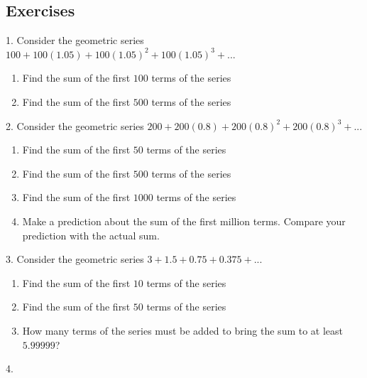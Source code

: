 \documentclass[10pt,]{book}
\theoremstyle{plain}
\theoremstyle{definition}
\theoremstyle{definition}
\theoremstyle{definition}
\numberwithin{equation}{section}
\begin{document}
\subsection[{Exercises}]{Exercises}\label{exercises-6}
\begin{exerciselist}
\item[1.]\hypertarget{exercise-32}{}\hypertarget{p-173}{}%
Consider the geometric series \(100+100(1.05)+100(1.05)^2+100(1.05)^3+...\)%
\leavevmode%
\begin{enumerate}[label=(\alph*)]
\item\hypertarget{li-65}{}Find the sum of the first \(100\) terms of the series%
\item\hypertarget{li-66}{}Find the sum of the first \(500\) terms of the series%
\end{enumerate}
\par\smallskip
\item[2.]\hypertarget{exercise-33}{}\hypertarget{p-174}{}%
Consider the geometric series \(200+200(0.8)+200(0.8)^2+200(0.8)^3+...\)%
\leavevmode%
\begin{enumerate}[label=(\alph*)]
\item\hypertarget{li-67}{}Find the sum of the first \(50\) terms of the series%
\item\hypertarget{li-68}{}Find the sum of the first \(500\) terms of the series%
\item\hypertarget{li-69}{}Find the sum of the first \(1000\) terms of the series%
\item\hypertarget{li-70}{}Make a prediction about the sum of the first million terms. Compare your prediction with the actual sum.%
\end{enumerate}
\par\smallskip
\item[3.]\hypertarget{exercise-34}{}\hypertarget{p-175}{}%
Consider the geometric series \(3+1.5+0.75+0.375+...\)%
\leavevmode%
\begin{enumerate}[label=(\alph*)]
\item\hypertarget{li-71}{}Find the sum of the first \(10\) terms of the series%
\item\hypertarget{li-72}{}Find the sum of the first \(50\) terms of the series%
\item\hypertarget{li-73}{}How many terms of the series must be added to bring the sum to at least \(5.99999\)?%
\end{enumerate}
\par\smallskip
\item[4.]\hypertarget{exercise-35}{}\hypertarget{p-176}{}%

\end{exerciselist}
\end{document}
